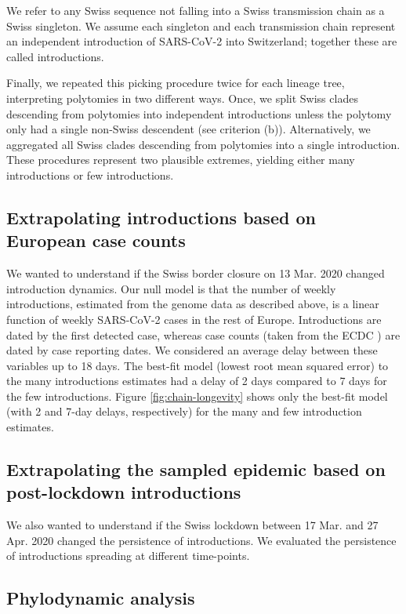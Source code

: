 \documentclass[11pt,twoside,lineno]{pnas-new} %
\begin{document}
We refer to any Swiss sequence not falling into a Swiss transmission chain as a Swiss singleton. We assume each singleton and each transmission chain represent an independent introduction of SARS-CoV-2 into Switzerland; together these are called introductions.

Finally, we repeated this picking procedure twice for each lineage tree, interpreting polytomies in two different ways. Once, we split Swiss clades descending from polytomies into independent introductions unless the polytomy only had a single non-Swiss descendent (see criterion (b)). Alternatively, we aggregated all Swiss clades descending from polytomies into a single introduction. These procedures represent two plausible extremes, yielding either many introductions or few introductions.

\subsection{Extrapolating introductions based on European case counts}
We wanted to understand if the Swiss border closure on 13 Mar. 2020 changed introduction dynamics. Our null model is that the number of weekly introductions, estimated from the genome data as described above, is a linear function of weekly SARS-CoV-2 cases in the rest of Europe. Introductions are dated by the first detected case, whereas case counts (taken from the ECDC \cite{ECDC}) are dated by case reporting dates. We considered an average delay between these variables up to 18 days. The best-fit model (lowest root mean squared error) to the many introductions estimates had a delay of 2 days compared to 7 days for the few introductions. Figure \ref{fig:chain-longevity} shows only the best-fit model (with 2 and 7-day delays, respectively) for the many and few introduction estimates.

\subsection{Extrapolating the sampled epidemic based on post-lockdown introductions}
We also wanted to understand if the Swiss lockdown between 17 Mar. and 27 Apr. 2020 changed the persistence of introductions. We evaluated the persistence of introductions spreading at different time-points.   

\subsection*{Phylodynamic analysis}
\end{document}
